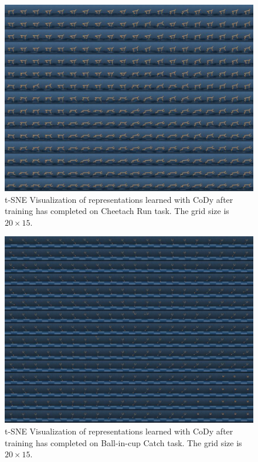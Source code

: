 \documentclass[a4paper,12pt]{article}
\begin{document}
\begin{figure}
\centering
\includegraphics[width=\textwidth]{vis/vis-cheetah-2021-10-19.pdf}
\caption{t-SNE Visualization of representations learned with CoDy after training has completed on Cheetach Run task. The grid size is $20 \times 15$.}
\label{vis:cheetah}
\end{figure}

\begin{figure}
\centering
\includegraphics[width=\textwidth]{vis/vis-ball_in_cup-2021-10-19.pdf}
\caption{t-SNE Visualization of representations learned with CoDy after training has completed on Ball-in-cup Catch task. The grid size is $20 \times 15$.}
\label{vis:ball-in-cup}
\end{figure}
\end{document}
